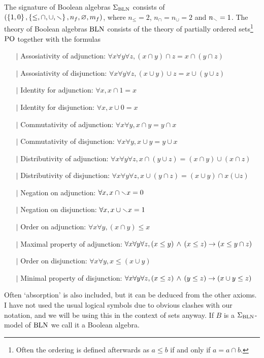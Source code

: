 \begin{dfn}
    The signature of Boolean algebras $\Sigma_{\mathrm{BLN}}$ consists of 
    $(\left\{1,0\right\},\left\{\leq,\cap,\cup,\smallsetminus\right\},n_f,\varnothing,m_f)$,
    where $n_\leq = 2$, $n_\cap = n_\cup = 2$ and $n_\smallsetminus = 1$.
    The theory of Boolean algebras $\mathrm{BLN}$ consists of the theory of 
    partially ordered sets\footnote{Often 
        the ordering is defined afterwards as 
        $a \leq b$ if and only if $a = a \cap b$.} 
    $\mathrm{PO}$ together with the formulas
    \begin{itemize}
        \item[$\vert$] Assosiativity of adjunction: 
            $\forall x \forall y \forall z, 
            (x \cap y) \cap z = x \cap (y \cap z)$
        \item[$\vert$] Assosiativity of disjunction: 
            $\forall x \forall y \forall z, 
            (x \cup y) \cup z = x \cup (y \cup z)$
        \item[$\vert$] Identity for adjunction:
            $\forall x, x \cap 1 = x$ 
        \item[$\vert$] Identity for disjunction:
            $\forall x, x \cup 0 = x$ 
        \item[$\vert$] Commutativity of adjunction: 
            $\forall x \forall y, x \cap y = y \cap x$
        \item[$\vert$] Commutativity of disjunction: 
            $\forall x \forall y, x \cup y = y \cup x$
        \item[$\vert$] Distributivity of adjunction:
            $\forall x \forall y \forall z, 
            x \cap (y \cup z) = (x \cap y) \cup (x \cap z)$
        \item[$\vert$] Distributivity of disjunction:
            $\forall x \forall y \forall z, 
            x \cup (y \cap z) = (x \cup y) \cap x (\cup z)$
        \item[$\vert$] Negation on adjunction: 
            $\forall x, x \cap \smallsetminus x = 0$ 
        \item[$\vert$] Negation on disjunction: 
            $\forall x, x \cup \smallsetminus x = 1$ 
        \item[$\vert$] Order on adjunction:
            $\forall x \forall y, (x \cap y) \leq x$
        \item[$\vert$] Maximal property of adjunction:
            $\forall x \forall y \forall z, 
            (x \leq y) \, \land \, (x \leq z) \to (x \leq y \cap z)$ 
        \item[$\vert$] Order on disjunction:
            $\forall x \forall y, x \leq (x \cup y)$ 
        \item[$\vert$] Minimal property of disjunction:
            $\forall x \forall y \forall z, 
            (x \leq z) \, \land \, (y \leq z) \to (x \cup y \leq z)$ 
        \end{itemize}
    Often `absorption' is also included, 
    but it can be deduced from the other axioms.
    I have not used the usual logical symbols due to obvious clashes with 
    our notation, 
    and we will be using this in the context of sets anyway.
    If $B$ is a $\Sigma_{\mathrm{BLN}}$-model of $\mathrm{BLN}$ we call it a Boolean algebra.
\end{dfn}

